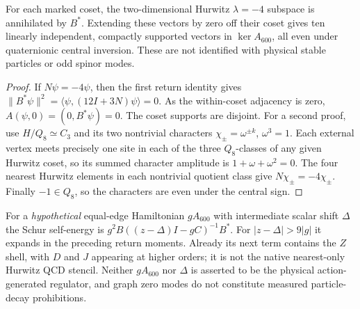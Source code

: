 \documentclass[11pt]{article}
\begin{document}
\begin{theorem}
\label{p1b:thm:v3027-hurwitz-character-zero-modes}
For each marked coset, the two-dimensional Hurwitz
$\lambda=-4$ subspace is annihilated by $B^*$. Extending these
vectors by zero off their coset gives ten linearly independent,
compactly supported vectors in $\ker A_{600}$, all even under
quaternionic central inversion. These are not identified with
physical stable particles or odd spinor modes.
\end{theorem}
\begin{proof}
If $N\psi=-4\psi$, then the first return identity gives
$\|B^*\psi\|^2=\langle\psi,(12I+3N)\psi\rangle=0$.
As the within-coset adjacency is zero, $A(\psi,0)=(0,B^*\psi)=0$.
The coset supports are disjoint. For a second proof, use
$H/Q_8\simeq C_3$ and its two nontrivial characters
$\chi_\pm=\omega^{\pm k}$, $\omega^3=1$.
Each external vertex meets precisely one site in each of the three
$Q_8$-classes of any given Hurwitz coset, so its summed character
amplitude is $1+\omega+\omega^2=0$. The four nearest Hurwitz elements
in each nontrivial quotient class give
$N\chi_\pm=-4\chi_\pm$.
Finally $-1\in Q_8$, so the characters are even under the central sign.
\end{proof}

\begin{remark}
\label{p1b:rem:v3027-return-physical-boundary}
For a \emph{hypothetical} equal-edge Hamiltonian $gA_{600}$ with
intermediate scalar shift $\Delta$ the Schur self-energy is
$g^2B((z-\Delta)I-gC)^{-1}B^*$.
For $|z-\Delta|>9|g|$ it expands in the preceding return moments.
Already its next term contains the $Z$ shell, with $D$ and $J$
appearing at higher orders; it is not the native nearest-only Hurwitz
QCD stencil. Neither $gA_{600}$ nor $\Delta$ is asserted to be the
physical action-generated regulator, and graph zero modes do not
constitute measured particle-decay prohibitions.
\end{remark}
\end{document}
